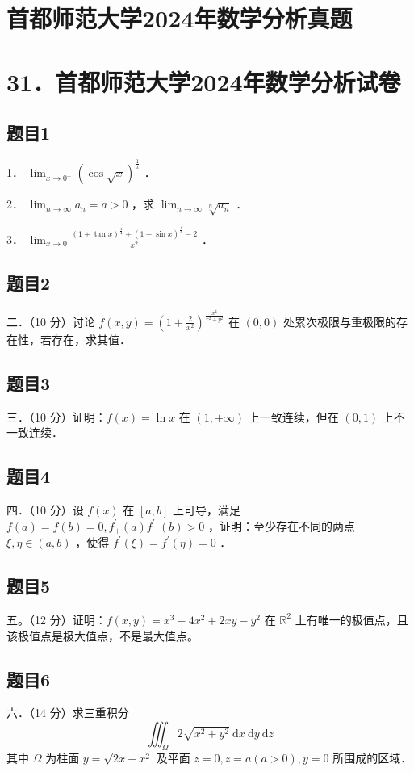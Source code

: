 \documentclass{article}
\begin{document}
\section*{首都师范大学2024年数学分析真题}
\section*{31．首都师范大学2024年数学分析试卷}

\subsection{题目1}
1． \(\lim _{x \rightarrow 0^{+}}(\cos \sqrt{x})^{\frac{1}{x}}\) ．

2． \(\lim _{n \rightarrow \infty} a_{n}=a>0\) ，求 \(\lim _{n \rightarrow \infty} \sqrt[n]{a_{n}}\) ．

3． \(\lim _{x \rightarrow 0} \frac{(1+\tan x)^{\frac{1}{4}}+(1-\sin x)^{\frac{1}{4}}-2}{x^{2}}\) ．

\subsection{题目2}
二．（10 分）讨论 \(f(x, y)=\left(1+\frac{2}{x^{2}}\right)^{\frac{x^{4}}{x^{2}+y^{2}}}\) 在 \((0,0)\) 处累次极限与重极限的存在性，若存在，求其值．

\subsection{题目3}
三．（10 分）证明：\(f(x)=\ln x\) 在 \((1,+\infty)\) 上一致连续，但在 \((0,1)\) 上不一致连续．

\subsection{题目4}
四．（10 分）设 \(f(x)\) 在 \([a, b]\) 上可导，满足 \(f(a)=f(b)=0, f_{+}^{\prime}(a) f_{-}^{\prime}(b)>0\) ，证明：至少存在不同的两点 \(\xi, \eta \in(a, b)\) ，使得 \(f^{\prime}(\xi)=f^{\prime}(\eta)=0\) ．

\subsection{题目5}
五。（12 分）证明：\(f(x, y)=x^{3}-4 x^{2}+2 x y-y^{2}\) 在 \(\mathbb{R}^{2}\) 上有唯一的极值点，且该极值点是极大值点，不是最大值点。

\subsection{题目6}
六．（14 分）求三重积分
\[
\iiint_{\Omega} 2 \sqrt{x^{2}+y^{2}} \mathrm{~d} x \mathrm{~d} y \mathrm{~d} z
\]
其中 \(\Omega\) 为柱面 \(y=\sqrt{2 x-x^{2}}\) 及平面 \(z=0, z=a(a>0), y=0\) 所围成的区域．
\end{document}
